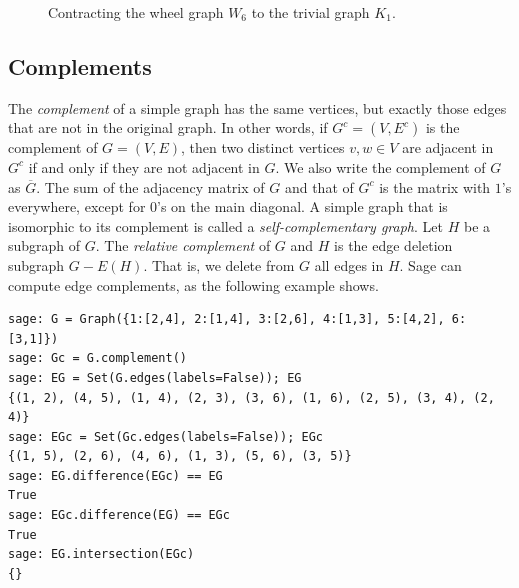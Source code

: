 \begin{figure}[!htbp]
{}
\caption{Contracting the wheel graph $W_6$ to the trivial graph $K_1$.}
\label{fig:introduction:edge_contraction_W6_to_K1}
\end{figure}



\subsection{Complements}

The \emph{complement} of a simple graph has the same
vertices, but exactly those edges that are not in the original
graph. In other words, if $G^c = (V, E^c)$ is the
complement of $G = (V,E)$, then two distinct vertices $v,w \in V$ are
adjacent in $G^c$ if and only if they are not adjacent in $G$. We also
write the complement of $G$ as
$\overline{G}$. The sum of the adjacency matrix
of $G$ and that of $G^c$ is the matrix with $1$'s everywhere, except
for $0$'s on the main diagonal. A simple graph that is isomorphic to
its complement is called a
\emph{self-complementary graph}. Let
$H$ be a subgraph of $G$. The
\emph{relative complement} of $G$ and $H$
is the edge deletion subgraph $G - E(H)$. That is, we delete from $G$
all edges in $H$. Sage can compute edge complements, as the following
example shows.
\begin{lstlisting}
sage: G = Graph({1:[2,4], 2:[1,4], 3:[2,6], 4:[1,3], 5:[4,2], 6:[3,1]})
sage: Gc = G.complement()
sage: EG = Set(G.edges(labels=False)); EG
{(1, 2), (4, 5), (1, 4), (2, 3), (3, 6), (1, 6), (2, 5), (3, 4), (2, 4)}
sage: EGc = Set(Gc.edges(labels=False)); EGc
{(1, 5), (2, 6), (4, 6), (1, 3), (5, 6), (3, 5)}
sage: EG.difference(EGc) == EG
True
sage: EGc.difference(EG) == EGc
True
sage: EG.intersection(EGc)
{}
\end{lstlisting}

